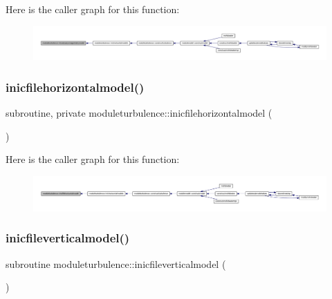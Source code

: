 Here is the caller graph for this function\+:\nopagebreak
\begin{figure}[H]
\begin{center}
\leavevmode
\includegraphics[width=350pt]{namespacemoduleturbulence_a7dcc612b541b2355f6ee7df80ef63634_icgraph}
\end{center}
\end{figure}
\mbox{\label{namespacemoduleturbulence_af876648dc22afb9f49305a2d9c2f1be4}} 
\subsubsection{\texorpdfstring{inicfilehorizontalmodel()}{inicfilehorizontalmodel()}}
{\footnotesize\ttfamily subroutine, private moduleturbulence\+::inicfilehorizontalmodel (\begin{DoxyParamCaption}{ }\end{DoxyParamCaption})\hspace{0.3cm}{\ttfamily [private]}}

Here is the caller graph for this function\+:\nopagebreak
\begin{figure}[H]
\begin{center}
\leavevmode
\includegraphics[width=350pt]{namespacemoduleturbulence_af876648dc22afb9f49305a2d9c2f1be4_icgraph}
\end{center}
\end{figure}
\mbox{\label{namespacemoduleturbulence_abccdbd06f5d7520144dadb5297887cfb}} 
\subsubsection{\texorpdfstring{inicfileverticalmodel()}{inicfileverticalmodel()}}
{\footnotesize\ttfamily subroutine moduleturbulence\+::inicfileverticalmodel (\begin{DoxyParamCaption}{ }\end{DoxyParamCaption})\hspace{0.3cm}{\ttfamily [private]}}

